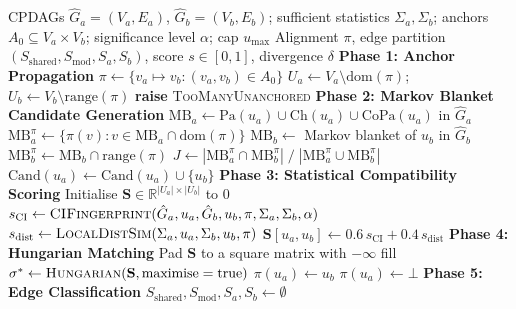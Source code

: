 \documentclass[11pt,a4paper]{article}
\theoremstyle{definition}
\begin{document}
\begin{algorithm}[t]
\caption{\textsc{CADA}: Context-Aware DAG Alignment}
\label{alg:cada}
\begin{algorithmic}[1]
\Require CPDAGs $\hat{G}_a=(V_a,E_a)$, $\hat{G}_b=(V_b,E_b)$;
  sufficient statistics $\Sigma_a,\Sigma_b$;
  anchors $A_0\subseteq V_a\times V_b$;
  significance level $\alpha$; cap $u_{\max}$
\Ensure Alignment $\pi$, edge partition
  $(S_{\mathrm{shared}},S_{\mathrm{mod}},S_a,S_b)$,
  score $s\in[0,1]$, divergence $\delta$
\Statex
\Statex \textbf{Phase 1: Anchor Propagation}
\State $\pi\gets\{v_a\mapsto v_b:(v_a,v_b)\in A_0\}$
\State $U_a\gets V_a\setminus\mathrm{dom}(\pi)$;\quad
       $U_b\gets V_b\setminus\mathrm{range}(\pi)$
  \State \textbf{raise} \textsc{TooManyUnanchored}
\EndIf
\Statex
\Statex \textbf{Phase 2: Markov Blanket Candidate Generation}
  \State $\mathrm{MB}_a\gets\mathrm{Pa}(u_a)\cup\mathrm{Ch}(u_a)
         \cup\mathrm{CoPa}(u_a)$ in $\hat{G}_a$
  \State $\mathrm{MB}_a^{\pi}\gets\{\pi(v):v\in\mathrm{MB}_a
         \cap\mathrm{dom}(\pi)\}$
    \State $\mathrm{MB}_b\gets$ Markov blanket of $u_b$ in $\hat{G}_b$
    \State $\mathrm{MB}_b^{\pi}\gets\mathrm{MB}_b\cap\mathrm{range}(\pi)$
    \State $J\gets|\mathrm{MB}_a^{\pi}\cap\mathrm{MB}_b^{\pi}|
            \;/\;|\mathrm{MB}_a^{\pi}\cup\mathrm{MB}_b^{\pi}|$
      \State $\mathrm{Cand}(u_a)\gets\mathrm{Cand}(u_a)\cup\{u_b\}$
    \EndIf
  \EndFor
\EndFor
\Statex
\Statex \textbf{Phase 3: Statistical Compatibility Scoring}
\State Initialise $\mathbf{S}\in\mathbb{R}^{|U_a|\times|U_b|}$ to $0$
  \State $s_{\mathrm{CI}}\gets\textsc{CIFingerprint}(\hat{G}_a,u_a,
         \hat{G}_b,u_b,\pi,\Sigma_a,\Sigma_b,\alpha)$
  \State $s_{\mathrm{dist}}\gets\textsc{LocalDistSim}(\Sigma_a,u_a,
         \Sigma_b,u_b,\pi)$
  \State $\mathbf{S}[u_a,u_b]\gets 0.6\,s_{\mathrm{CI}}
         +0.4\,s_{\mathrm{dist}}$
\EndFor
\Statex
\Statex \textbf{Phase 4: Hungarian Matching}
\State Pad $\mathbf{S}$ to a square matrix with $-\infty$ fill
\State $\sigma^*\gets\textsc{Hungarian}(\mathbf{S},\text{maximise}=
       \mathrm{true})$
    $\pi(u_a)\gets u_b$
  \Else\; $\pi(u_a)\gets\bot$
  \EndIf
\EndFor
\Statex
\Statex \textbf{Phase 5: Edge Classification}
\State $S_{\mathrm{shared}},S_{\mathrm{mod}},S_a,S_b\gets\emptyset$

\end{algorithmic}
\end{algorithm}
\end{document}
